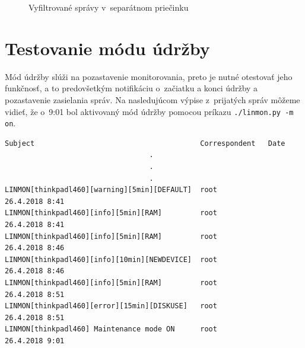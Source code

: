 \vspace{-1.5em}
\begin{figure}[H]
	\begin{center}
		\vspace{-0.5em}
		\caption{Vyfiltrované správy v~separátnom priečinku}
		\label{thunderbird}
	\end{center}
\end{figure} 
\section{Testovanie módu údržby}
Mód údržby slúži na pozastavenie monitorovania, preto je nutné otestovať jeho funkčnosť, a to predovšetkým notifikáciu o~začiatku a konci údržby a pozastavenie zasielania správ. Na nasledujúcom výpise z~prijatých správ môžeme vidieť, že o~9:01 bol aktivovaný mód údržby pomocou príkazu \texttt{./linmon.py -m on}.

\begin{verbatim}
Subject                                       Correspondent   Date
                                  .
                                  .
                                  .
LINMON[thinkpadl460][warning][5min][DEFAULT]  root            26.4.2018 8:41
LINMON[thinkpadl460][info][5min][RAM]         root            26.4.2018 8:41
LINMON[thinkpadl460][info][5min][RAM]         root            26.4.2018 8:46
LINMON[thinkpadl460][info][10min][NEWDEVICE]  root            26.4.2018 8:46
LINMON[thinkpadl460][info][5min][RAM]         root            26.4.2018 8:51
LINMON[thinkpadl460][error][15min][DISKUSE]   root            26.4.2018 8:51
LINMON[thinkpadl460] Maintenance mode ON      root            26.4.2018 9:01
\end{verbatim}


